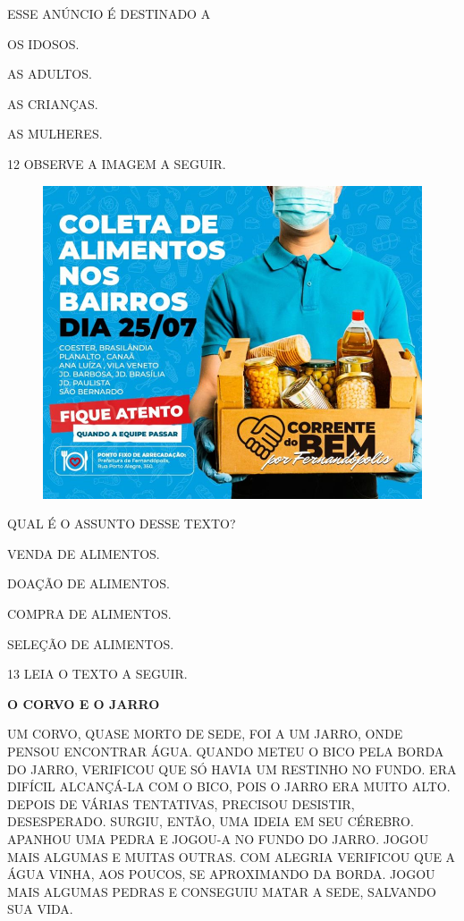 ESSE ANÚNCIO É DESTINADO A

\begin{escolha}

\item OS IDOSOS.

\item AS ADULTOS.

\item AS CRIANÇAS.

\item AS MULHERES.

\end{escolha}

\num{12} OBSERVE A IMAGEM A SEGUIR.

\begin{figure}[H]
\centering
\includegraphics[width=.6\textwidth]{./media/image236.png}
\end{figure}

QUAL É O ASSUNTO DESSE TEXTO?

\begin{escolha}

\item VENDA DE ALIMENTOS.

\item DOAÇÃO DE ALIMENTOS.

\item COMPRA DE ALIMENTOS.

\item SELEÇÃO DE ALIMENTOS.

\end{escolha}

\num{13} LEIA O TEXTO A SEGUIR.

\begin{myquote}
\textbf{O CORVO E O JARRO}

UM CORVO, QUASE MORTO DE SEDE, FOI A UM JARRO, ONDE PENSOU ENCONTRAR ÁGUA. QUANDO METEU O BICO PELA BORDA DO JARRO, VERIFICOU QUE SÓ HAVIA UM RESTINHO NO FUNDO. ERA DIFÍCIL ALCANÇÁ-LA COM O BICO, POIS O JARRO ERA MUITO ALTO.
DEPOIS DE VÁRIAS TENTATIVAS, PRECISOU DESISTIR, DESESPERADO. SURGIU, ENTÃO, UMA IDEIA EM SEU CÉREBRO.
APANHOU UMA PEDRA E JOGOU-A NO FUNDO DO JARRO. JOGOU MAIS
ALGUMAS E MUITAS OUTRAS.
COM ALEGRIA VERIFICOU QUE A ÁGUA VINHA, AOS POUCOS, SE APROXIMANDO DA BORDA. JOGOU MAIS ALGUMAS PEDRAS E CONSEGUIU MATAR A SEDE, SALVANDO SUA VIDA.

\end{myquote}

